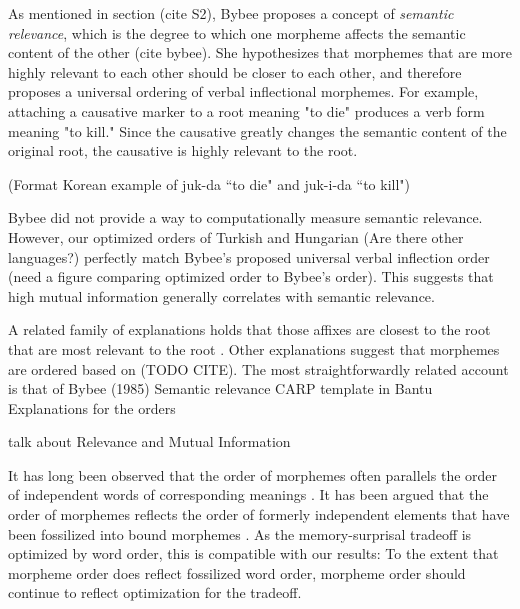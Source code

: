 \documentclass[11pt,letterpaper]{article}
\newcommand\becky[1]{{\color{blue}(#1)}}
\begin{document}
As mentioned in section \becky{cite S2}, Bybee proposes a concept of \textit{semantic relevance}, which is the degree to which one morpheme affects the semantic content of the other \becky{cite bybee}. She hypothesizes that morphemes that are more highly relevant to each other should be closer to each other, and therefore proposes a universal ordering of verbal inflectional morphemes. For example, attaching a causative marker to a root meaning "to die" produces a verb form meaning "to kill." Since the causative greatly changes the semantic content of the original root, the causative is highly relevant to the root. 

\becky{Format Korean example of juk-da ``to die" and juk-i-da ``to kill"}

Bybee did not provide a way to computationally measure semantic relevance. However, our optimized orders of Turkish and Hungarian \becky{Are there other languages?} perfectly match Bybee's proposed universal verbal inflection order \becky{need a figure comparing optimized order to Bybee's order}. This suggests that high mutual information generally correlates with semantic relevance. 


A related family of explanations holds that those affixes are closest to the root that are most relevant to the root \citep{bybee-morphology-1985}.
Other explanations suggest that morphemes are ordered based on (TODO CITE).
The most straightforwardly related account is that of Bybee (1985) Semantic relevance
CARP template in Bantu
Explanations for the orders

talk about Relevance and Mutual Information


It has long been observed that the order of morphemes often parallels the order of independent words of corresponding meanings \citep{givon1971historical,venneman1973explanation,baker1985the}.
It has been argued that the order of morphemes reflects the order of formerly independent elements that have been fossilized into bound morphemes \citet{givon1971historical,venneman1973explanation}.
As the memory-surprisal tradeoff is optimized by word order, this is compatible with our results:
To the extent that morpheme order does reflect fossilized word order, morpheme order should continue to reflect optimization for the tradeoff.
\end{document}
